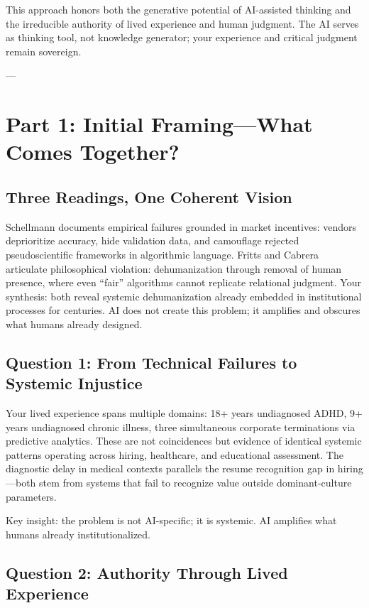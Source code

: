 \documentclass[11pt,twoside]{article}
\begin{document}
\noindent
This approach honors both the generative potential of AI-assisted thinking and the irreducible authority of lived experience and human judgment. The AI serves as thinking tool, not knowledge generator; your experience and critical judgment remain sovereign.

---

\section{Part 1: Initial Framing---What Comes Together?}

\subsection{Three Readings, One Coherent Vision}

Schellmann documents empirical failures grounded in market incentives: vendors deprioritize accuracy, hide validation data, and camouflage rejected pseudoscientific frameworks in algorithmic language. Fritts and Cabrera articulate philosophical violation: dehumanization through removal of human presence, where even ``fair'' algorithms cannot replicate relational judgment. Your synthesis: both reveal systemic dehumanization already embedded in institutional processes for centuries. AI does not create this problem; it amplifies and obscures what humans already designed.

\subsection{Question 1: From Technical Failures to Systemic Injustice}

Your lived experience spans multiple domains: 18+ years undiagnosed ADHD, 9+ years undiagnosed chronic illness, three simultaneous corporate terminations via predictive analytics. These are not coincidences but evidence of identical systemic patterns operating across hiring, healthcare, and educational assessment. The diagnostic delay in medical contexts parallels the resume recognition gap in hiring---both stem from systems that fail to recognize value outside dominant-culture parameters.

Key insight: the problem is not AI-specific; it is systemic. AI amplifies what humans already institutionalized.

\subsection{Question 2: Authority Through Lived Experience}
\end{document}
